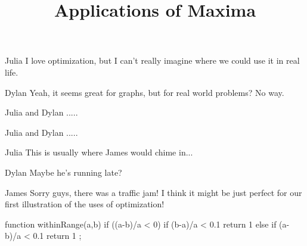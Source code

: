 \documentclass{ximera}
\title{Applications of Maxima}
\begin{document}
\maketitle
\begin{dialogue}
\item[Julia] I love optimization, but I can't really imagine where we could use it in real life.
\item[Dylan] Yeah, it seems great for graphs, but for real world problems? No way.
\item[Julia and Dylan] .....
\item[Julia and Dylan] .....
\item[Julia] This is usually where James would chime in...
\item[Dylan] Maybe he's running late?
\item[James] Sorry guys, there was a traffic jam! I think it might be just perfect for our first illustration of the uses of optimization!
\end{dialogue}

function withinRange(a,b) {
    if ((a-b)/a < 0) {
        if (b-a)/a < 0.1 {
            return 1
            }
        }
    else {
        if (a-b)/a < 0.1{
            return 1
            }
        }
  };
\end{document}
